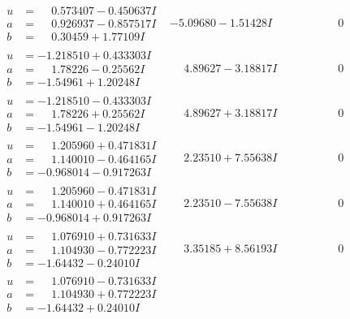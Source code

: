 \documentclass[1p]{elsarticle_modified}
\theoremstyle{definition}
\begin{document}
$$\begin{array}{c|c|c}
\begin{aligned}
u &= \phantom{-}0.573407 - 0.450637 I \\
a &= \phantom{-}0.926937 - 0.857517 I \\
b &= \phantom{-}0.30459 + 1.77109 I\end{aligned}
 & -5.09680 - 1.51428 I & \phantom{-0.000000 } 0 \\ \hline\begin{aligned}
u &= -1.218510 + 0.433303 I \\
a &= \phantom{-}1.78226 - 0.25562 I \\
b &= -1.54961 + 1.20248 I\end{aligned}
 & \phantom{-}4.89627 - 3.18817 I & \phantom{-0.000000 } 0 \\ \hline\begin{aligned}
u &= -1.218510 - 0.433303 I \\
a &= \phantom{-}1.78226 + 0.25562 I \\
b &= -1.54961 - 1.20248 I\end{aligned}
 & \phantom{-}4.89627 + 3.18817 I & \phantom{-0.000000 } 0 \\ \hline\begin{aligned}
u &= \phantom{-}1.205960 + 0.471831 I \\
a &= \phantom{-}1.140010 - 0.464165 I \\
b &= -0.968014 - 0.917263 I\end{aligned}
 & \phantom{-}2.23510 + 7.55638 I & \phantom{-0.000000 } 0 \\ \hline\begin{aligned}
u &= \phantom{-}1.205960 - 0.471831 I \\
a &= \phantom{-}1.140010 + 0.464165 I \\
b &= -0.968014 + 0.917263 I\end{aligned}
 & \phantom{-}2.23510 - 7.55638 I & \phantom{-0.000000 } 0 \\ \hline\begin{aligned}
u &= \phantom{-}1.076910 + 0.731633 I \\
a &= \phantom{-}1.104930 - 0.772223 I \\
b &= -1.64432 - 0.24010 I\end{aligned}
 & \phantom{-}3.35185 + 8.56193 I & \phantom{-0.000000 } 0 \\ \hline\begin{aligned}
u &= \phantom{-}1.076910 - 0.731633 I \\
a &= \phantom{-}1.104930 + 0.772223 I \\
b &= -1.64432 + 0.24010 I\end{aligned}

\end{array}$$
\end{document}
